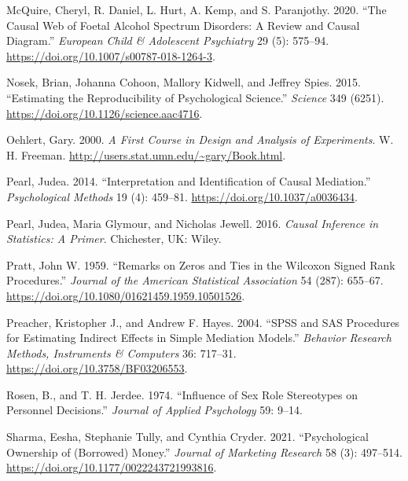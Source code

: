 \documentclass[
  11pt,
  letterpaper,
]{scrbook}
\newlength{\cslhangindent}
\newlength{\cslentryspacingunit} %
\newenvironment{CSLReferences}[2] %
 {%
  \setlength{\parindent}{0pt}
  \ifodd #1
  \let\oldpar\par
  \def\par{\hangindent=\cslhangindent\oldpar}
  \fi
  \setlength{\parskip}{#2\cslentryspacingunit}
 }%
 {}
\theoremstyle{definition}
\theoremstyle{remark}
\begin{document}
\begin{CSLReferences}{1}{0}
\leavevmode{}%
McQuire, Cheryl, R. Daniel, L. Hurt, A. Kemp, and S. Paranjothy. 2020.
{``The Causal Web of Foetal Alcohol Spectrum Disorders: A Review and
Causal Diagram.''} \emph{European Child {\&} Adolescent Psychiatry} 29
(5): 575--94. \url{https://doi.org/10.1007/s00787-018-1264-3}.

\leavevmode{}%
Nosek, Brian, Johanna Cohoon, Mallory Kidwell, and Jeffrey Spies. 2015.
{``Estimating the Reproducibility of Psychological Science.''}
\emph{Science} 349 (6251).
\url{https://doi.org/10.1126/science.aac4716}.

\leavevmode{}%
Oehlert, Gary. 2000. \emph{A First Course in Design and Analysis of
Experiments}. W. H. Freeman.
\url{http://users.stat.umn.edu/~gary/Book.html}.

\leavevmode{}%
Pearl, Judea. 2014. {``Interpretation and Identification of Causal
Mediation.''} \emph{Psychological Methods} 19 (4): 459--81.
\url{https://doi.org/10.1037/a0036434}.

\leavevmode{}%
Pearl, Judea, Maria Glymour, and Nicholas Jewell. 2016. \emph{Causal
Inference in Statistics: A Primer}. Chichester, UK: Wiley.

\leavevmode{}%
Pratt, John W. 1959. {``Remarks on Zeros and Ties in the {W}ilcoxon
Signed Rank Procedures.''} \emph{Journal of the American Statistical
Association} 54 (287): 655--67.
\url{https://doi.org/10.1080/01621459.1959.10501526}.

\leavevmode{}%
Preacher, Kristopher J., and Andrew F. Hayes. 2004. {``{SPSS} and {SAS}
Procedures for Estimating Indirect Effects in Simple Mediation
Models.''} \emph{Behavior Research Methods, Instruments {\&} Computers}
36: 717--31. \url{https://doi.org/10.3758/BF03206553}.

\leavevmode{}%
Rosen, B., and T. H. Jerdee. 1974. {``Influence of Sex Role Stereotypes
on Personnel Decisions.''} \emph{Journal of Applied Psychology} 59:
9--14.

\leavevmode{}%
Sharma, Eesha, Stephanie Tully, and Cynthia Cryder. 2021.
{``Psychological Ownership of (Borrowed) Money.''} \emph{Journal of
Marketing Research} 58 (3): 497--514.
\url{https://doi.org/10.1177/0022243721993816}.


\end{CSLReferences}
\end{document}
